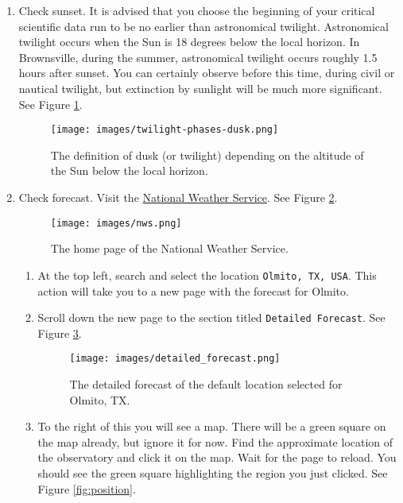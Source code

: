 \documentclass{article}
\begin{document}
	\begin{enumerate}
		
		\item Check sunset. It is advised that you choose the beginning of your critical scientific data run to be no earlier than astronomical twilight. Astronomical twilight occurs when the Sun is 18 degrees below the local horizon. In Brownsville, during the summer, astronomical twilight occurs roughly 1.5 hours after sunset. You can certainly observe before this time, during civil or nautical twilight, but extinction by sunlight will be much more significant. See Figure \ref{fig:twilight}.
		
		\begin{figure}[htbp!]
			\centering
			\texttt{[image: images/twilight-phases-dusk.png]}
			\caption{The definition of dusk (or twilight) depending on the altitude of the Sun below the local horizon.}
			\label{fig:twilight}
		\end{figure}
		
		\item Check forecast. Visit the \href{https://www.weather.gov}{National Weather Service}. See Figure \ref{fig:nws}.
		
		\begin{figure}[htbp!]
			\centering
			\texttt{[image: images/nws.png]}
			\caption{The home page of the National Weather Service.}
			\label{fig:nws}
		\end{figure}
		
		\begin{enumerate}
			
			\item At the top left, search and select the location \texttt{Olmito, TX, USA}. This action will take you to a new page with the forecast for Olmito.		
			
			\item Scroll down the new page to the section titled \texttt{Detailed Forecast}. See Figure \ref{fig:forecast}.
			
			\begin{figure}[htbp!]
				\centering
				\texttt{[image: images/detailed\_forecast.png]}
				\caption{The detailed forecast of the default location selected for Olmito, TX.}
				\label{fig:forecast}
			\end{figure}
			
			\item To the right of this you will see a map. There will be a green square on the map already, but ignore it for now. Find the approximate location of the observatory and click it on the map. Wait for the page to reload. You should see the green square highlighting the region you just clicked. See Figure \ref{fig:position}.
			

\end{enumerate}
\end{enumerate}
\end{document}
